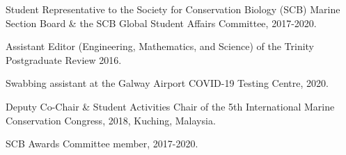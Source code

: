 \documentclass[a4paper]{deedy-resume} %
\begin{document}
\begin{flushleft}

\begin{tightitemize}
\item Student Representative to the Society for Conservation Biology (SCB) Marine Section Board \& the SCB Global Student Affairs Committee, 2017-2020. 
\item Assistant Editor (Engineering, Mathematics, and Science) of the Trinity Postgraduate Review 2016.
\end{tightitemize}

\sectionspace

\begin{tightitemize}
\item Swabbing assistant at the Galway Airport COVID-19 Testing Centre, 2020.
\item Deputy Co-Chair \& Student Activities Chair of the 5th International Marine Conservation Congress, 2018, Kuching, Malaysia.
\item SCB Awards Committee member, 2017-2020.
\end{tightitemize}

\sectionspace

\end{flushleft}



\newpage %


\sectionspace

\end{document}

